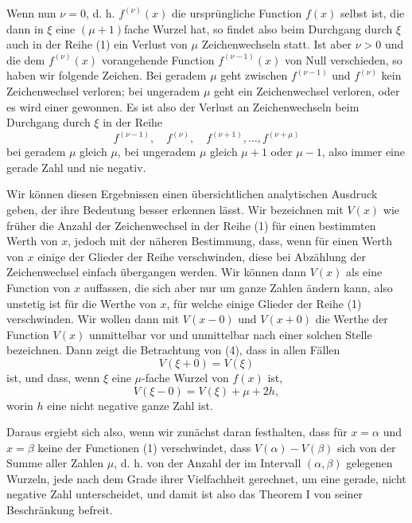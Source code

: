 \documentclass[11pt]{article}
\begin{document}
Wenn nun $\nu=0$, d. h. $f^{(\nu)}(x)$ die ursprüngliche Function $f(x)$ selbst ist, die dann in $\xi$ eine $(\mu+1)$fache Wurzel hat, so findet also beim Durchgang durch $\xi$ auch in der Reihe (1) ein Verlust von $\mu$ Zeichenwechseln statt. Ist aber $\nu>0$ und die dem $f^{(\nu)}(x)$ vorangehende Function $f^{(\nu-1)}(x)$ von Null verschieden, so haben wir folgende Zeichen. Bei geradem $\mu$ geht zwischen $f^{(\nu-1)}$ und $f^{(\nu)}$ kein Zeichenwechsel verloren; bei ungeradem $\mu$ geht ein Zeichenwechsel verloren, oder es wird einer gewonnen. Es ist also der Verlust an Zeichenwechseln beim Durchgang durch $\xi$ in der Reihe
\begin{equation}
        f^{(\nu-1)},\quad f^{(\nu)},\quad f^{(\nu+1)},\ldots,
        f^{(\nu+\mu)}
\tag{5}
\end{equation}
bei geradem $\mu$ gleich $\mu$, bei ungeradem $\mu$ gleich $\mu+1$ oder $\mu-1$, also immer eine gerade Zahl und nie negativ.

Wir können diesen Ergebnissen einen übersichtlichen analytischen Ausdruck geben, der ihre Bedeutung besser erkennen lässt. Wir bezeichnen mit $V(x)$ wie früher die Anzahl der Zeichenwechsel in der Reihe (1) für einen bestimmten Werth von $x$, jedoch mit der näheren Bestimmung, dass, wenn für einen Werth von $x$ einige der Glieder der Reihe verschwinden, diese bei Abzählung der Zeichenwechsel einfach übergangen werden. Wir können dann $V(x)$ als eine Function von $x$ auffassen, die sich aber nur um ganze Zahlen ändern kann, also unstetig ist für die Werthe von $x$, für welche einige Glieder der Reihe (1) verschwinden. Wir wollen dann mit $V(x-0)$ und $V(x+0)$ die Werthe der Function $V(x)$ unmittelbar vor und unmittelbar nach einer solchen Stelle bezeichnen. Dann zeigt die Betrachtung von (4), dass in allen Fällen
\begin{equation}
        V(\xi+0)=V(\xi)
\tag{6}
\end{equation}
ist, und dass, wenn $\xi$ eine $\mu$-fache Wurzel von $f(x)$ ist,
\begin{equation}
        V(\xi-0)=V(\xi)+\mu+2h,
\tag{7}
\end{equation}
worin $h$ eine nicht negative ganze Zahl ist.

Daraus ergiebt sich also, wenn wir zunächst daran festhalten, dass für $x=\alpha$ und $x=\beta$ keine der Functionen (1) verschwindet, dass $V(\alpha)-V(\beta)$ sich von der Summe aller Zahlen $\mu$, d. h. von der Anzahl der im Intervall $(\alpha,\beta)$ gelegenen Wurzeln, jede nach dem Grade ihrer Vielfachheit gerechnet, um eine gerade, nicht negative Zahl unterscheidet, und damit ist also das Theorem I von seiner Beschränkung befreit.
\end{document}
